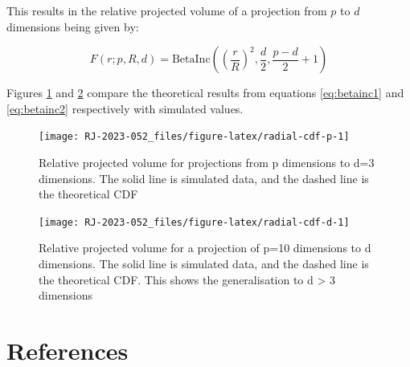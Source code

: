 This results in the relative projected volume of a projection from \(p\) to \(d\) dimensions being given by:

\begin{equation}
F(r; p, R, d) = \mathrm{BetaInc}\left(\left(\frac{r}{R}\right)^2, \frac{d}{2}, \frac{p-d}{2}+1\right)
\label{eq:betainc2}
\end{equation}

Figures \ref{fig:radial-cdf-p} and \ref{fig:radial-cdf-d} compare the theoretical results from equations \eqref{eq:betainc1} and \eqref{eq:betainc2} respectively with simulated values.

\begin{figure}

{\centering \texttt{[image: RJ-2023-052\_files/figure-latex/radial-cdf-p-1]} 

}

\caption{Relative projected volume for projections from p dimensions to d=3 dimensions. The solid line is simulated data, and the dashed line is the theoretical CDF}\label{fig:radial-cdf-p}
\end{figure}

\begin{figure}

{\centering \texttt{[image: RJ-2023-052\_files/figure-latex/radial-cdf-d-1]} 

}

\caption{Relative projected volume for a projection of p=10 dimensions to d dimensions.  The solid line is simulated data, and the dashed line is the theoretical CDF. This shows the generalisation to d > 3 dimensions}\label{fig:radial-cdf-d}
\end{figure}

\hypertarget{references}{%
\section*{References}\label{references}}

